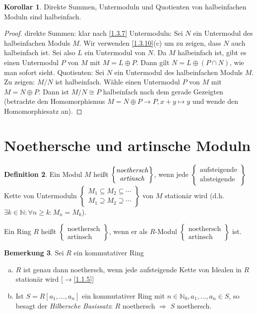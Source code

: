 \documentclass[
twoside=semi,
fontsize=12,
DIV=12, 
cleardoublepage=current,
leqno,
headings=optiontoheadandtoc, 
toc=idx
]{scrbook}
\newcommand{\N}{\mathbb{N}}
\newcommand{\textcase}[2]{$\begin{Bmatrix} \textrm{#1} \\ \textrm{#2}\end{Bmatrix}$}
\newcommand{\case}[2]{\begin{Bmatrix} #1 \\ #2\end{Bmatrix}}
\theoremstyle{definition}
\newtheorem{definition}{Definition}[section]
\newtheorem{bemerkung}[definition]{Bemerkung}
\newtheorem{korollar}[definition]{Korollar}
\begin{document}
	\begin{korollar}\label{1.3.11}\hfill\newline
		Direkte Summen, Untermoduln und Quotienten von halbeinfachen Moduln sind halbeinfach.
		
		\begin{proof}
			direkte Summen: klar nach \ref{1.3.7}\newline
			Untermoduln: Sei $N$ ein Untermodul des halbeinfachen Moduls $M$. Wir verwenden \ref{1.3.10}(c) um zu zeigen, dass $N$ auch halbeinfach ist. Sei also $L$ ein Untermodul von $N$. Da $M$ halbeinfach ist, gibt es einen Untermodul $P$ von $M$ mit $M = L \oplus P$. Dann gilt $N = L \oplus (P \cap N)$, wie man sofort sieht.\newline
			Quotienten: Sei $N$ ein Untermodul des halbeinfachen Moduls $M$. Zu zeigen: $M/N$ ist halbeinfach.\newline
			W\"ahle einen Untermodul $P$ von $M$ mit $M = N \oplus P$. Dann ist $M/N \cong P$ halbeinfach nach dem gerade Gezeigten (betrachte den Homomorphismus $M = N \oplus P \to P, x+y \mapsto y$ und wende den Homomorphiesatz an).
		\end{proof}
	\end{korollar}
	\newpage
	
	\section{Noethersche und artinsche Moduln}\thispagestyle{sectionstart}
	\begin{definition}\label{1.4.1}\hfill\newline
		Ein Modul $M$ hei\ss t \textcase{\emph{noethersch}\index{Modul@\textbf{Modul}!Noethersche Moduln}}{\emph{artinsch}\index{Modul@\textbf{Modul}!Artinsche Moduln}}, wenn jede \textcase{aufsteigende}{absteigende} Kette von Untermoduln $\case{M_1 \subseteq M_2 \subseteq \cdots}{M_1 \supseteq M_2 \supseteq \cdots}$ von $M$ station\"ar wird (d.h. $\exists k \in \N: \forall n \geq k: M_n = M_k$).
		
		\noindent Ein Ring $R$ hei\ss t \textcase{noethersch}{artinsch}, wenn er als $R$-Modul \textcase{noethersch}{artinsch} ist.
	\end{definition}

	\begin{bemerkung}\label{1.4.2}\hfill\newline
		Sei $R$ ein kommutativer Ring
		
		\begin{enumerate}[(a)]
			\item $R$ ist genau dann noethersch, wenn jede aufsteigende Kette von Idealen in $R$ station\"ar wird [$\to$\ref{1.1.5}]
			
			\item Ist $S = R[a_1, \dots, a_n]$ ein kommutativer Ring mit $n \in \N_0, a_1, \dots, a_n \in S$, so besagt der \emph{Hilbersche Basissatz}:
				$R$ noethersch $\Longrightarrow$ $S$ noethersch.
		\end{enumerate}
	\end{bemerkung}
\end{document}
